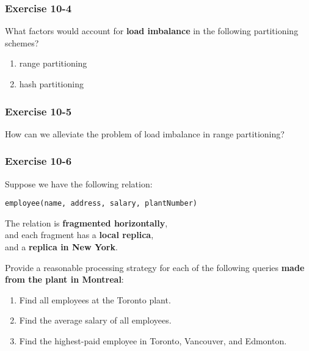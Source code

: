 \begin{frame}
\frametitle{Exercise 10-4}

What factors would account for \textbf{load imbalance} in the following partitioning schemes?

\begin{enumerate}
  \item range partitioning
  \item hash partitioning
\end{enumerate}

\end{frame}


\begin{frame}
\frametitle{Exercise 10-5}

How can we alleviate the problem of load imbalance in range partitioning?

\end{frame}


\begin{frame}
\frametitle{Exercise 10-6}

Suppose we have the following relation: \\
\begin{center}
  \texttt{employee(name, address, salary, plantNumber)}
\end{center}

The relation is \textbf{fragmented horizontally}, \\
and each fragment has a \textbf{local replica}, \\
and a \textbf{replica in New York}.

Provide a reasonable processing strategy for each of the following queries \textbf{made from the plant in Montreal}:

\begin{enumerate}
  \item Find all employees at the Toronto plant.
  \item Find the average salary of all employees.
  \item Find the highest-paid employee in Toronto, Vancouver, and Edmonton.
\end{enumerate}

\end{frame}


